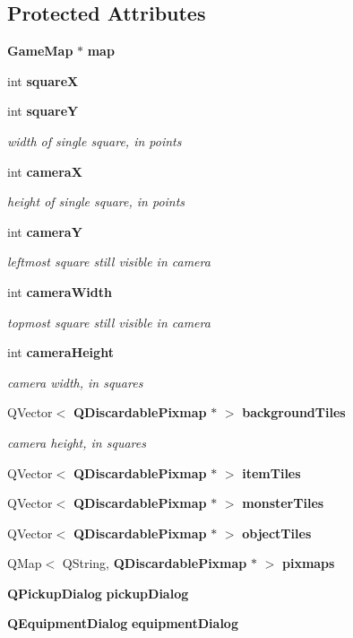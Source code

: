 \subsection*{Protected Attributes}
\begin{CompactItemize}
\item 
{\bf Game\-Map} $\ast$ {\bf map}
\item 
int {\bf square\-X}
\item 
int {\bf square\-Y}
\begin{CompactList}\small\item\em width of single square, in points \item\end{CompactList}\item 
int {\bf camera\-X}
\begin{CompactList}\small\item\em height of single square, in points \item\end{CompactList}\item 
int {\bf camera\-Y}
\begin{CompactList}\small\item\em leftmost square still visible in camera \item\end{CompactList}\item 
int {\bf camera\-Width}
\begin{CompactList}\small\item\em topmost square still visible in camera \item\end{CompactList}\item 
int {\bf camera\-Height}
\begin{CompactList}\small\item\em camera width, in squares \item\end{CompactList}\item 
QVector$<$ {\bf QDiscardable\-Pixmap} $\ast$ $>$ {\bf background\-Tiles}
\begin{CompactList}\small\item\em camera height, in squares \item\end{CompactList}\item 
QVector$<$ {\bf QDiscardable\-Pixmap} $\ast$ $>$ {\bf item\-Tiles}
\item 
QVector$<$ {\bf QDiscardable\-Pixmap} $\ast$ $>$ {\bf monster\-Tiles}
\item 
QVector$<$ {\bf QDiscardable\-Pixmap} $\ast$ $>$ {\bf object\-Tiles}
\item 
QMap$<$ QString, {\bf QDiscardable\-Pixmap} $\ast$ $>$ {\bf pixmaps}
\item 
{\bf QPickup\-Dialog} {\bf pickup\-Dialog}
\item 
{\bf QEquipment\-Dialog} {\bf equipment\-Dialog}
\end{CompactItemize}


